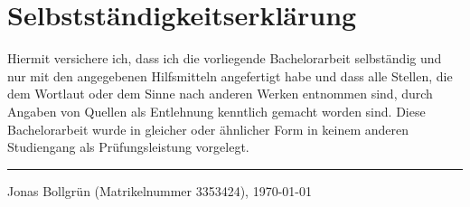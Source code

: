 \thispagestyle{empty}
\newpage

\chapter*{Selbstständigkeitserklärung}
Hiermit versichere ich, dass ich die vorliegende Bachelorarbeit selbständig und
nur mit den angegebenen Hilfsmitteln angefertigt habe und dass alle Stellen,
die dem Wortlaut oder dem Sinne nach anderen Werken entnommen sind,
durch Angaben von Quellen als Entlehnung kenntlich gemacht worden sind.
Diese Bachelorarbeit wurde in gleicher oder ähnlicher Form in keinem anderen
Studiengang als Prüfungsleistung vorgelegt.

\vspace*{8ex}
\hrule
\vspace*{2ex}
Jonas Bollgrün (Matrikelnummer 3353424), \today

